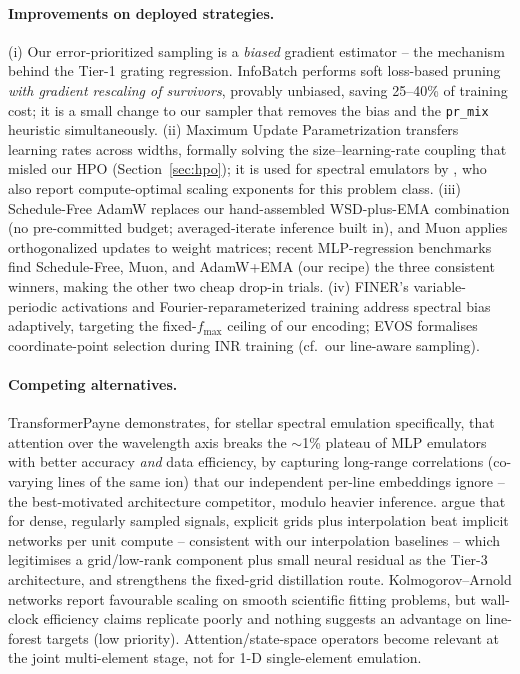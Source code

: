 \documentclass[11pt,a4paper]{article}
\newcommand{\code}[1]{\texttt{#1}}
\begin{document}
\paragraph{Improvements on deployed strategies.}
(i) Our error-prioritized sampling is a \emph{biased} gradient
estimator -- the mechanism behind the Tier-1 grating regression.
InfoBatch \citep{qin24} performs soft loss-based pruning \emph{with
gradient rescaling of survivors}, provably unbiased, saving 25--40\%
of training cost; it is a small change to our sampler that removes the
bias and the \code{pr\_mix} heuristic simultaneously.
(ii) Maximum Update Parametrization \citep{yang21mup} transfers
learning rates across widths, formally solving the size--learning-rate
coupling that misled our HPO (Section~\ref{sec:hpo}); it is used for
spectral emulators by \citet{rozanski25scaling}, who also report
compute-optimal scaling exponents for this problem class.
(iii) Schedule-Free AdamW \citep{defazio24} replaces our hand-assembled
WSD-plus-EMA combination (no pre-committed budget; averaged-iterate
inference built in), and Muon \citep{jordan24} applies orthogonalized
updates to weight matrices; recent MLP-regression benchmarks find
Schedule-Free, Muon, and AdamW+EMA (our recipe) the three consistent
winners, making the other two cheap drop-in trials.
(iv) FINER's variable-periodic activations \citep{liu24finer} and
Fourier-reparameterized training \citep{shi24} address spectral bias
adaptively, targeting the fixed-$f_{\max}$ ceiling of our encoding;
EVOS \citep{zhang24evos} formalises coordinate-point selection during
INR training (cf.\ our line-aware sampling).

\paragraph{Competing alternatives.}
TransformerPayne \citep{rozanski25} demonstrates, for stellar spectral
emulation specifically, that attention over the wavelength axis breaks
the $\sim$1\% plateau of MLP emulators with better accuracy \emph{and}
data efficiency, by capturing long-range correlations (co-varying lines
of the same ion) that our independent per-line embeddings ignore -- the
best-motivated architecture competitor, modulo heavier inference.
\citet{yang25grids} argue that for dense, regularly sampled signals,
explicit grids plus interpolation beat implicit networks per unit
compute -- consistent with our interpolation baselines -- which
legitimises a grid/low-rank component plus small neural residual as the
Tier-3 architecture, and strengthens the fixed-grid distillation route.
Kolmogorov--Arnold networks \citep{liu24kan} report favourable scaling
on smooth scientific fitting problems, but wall-clock efficiency claims
replicate poorly and nothing suggests an advantage on line-forest
targets (low priority). Attention/state-space operators
\citep[e.g.][]{wu24transolver} become relevant at the joint
multi-element stage, not for 1-D single-element emulation.
\end{document}
